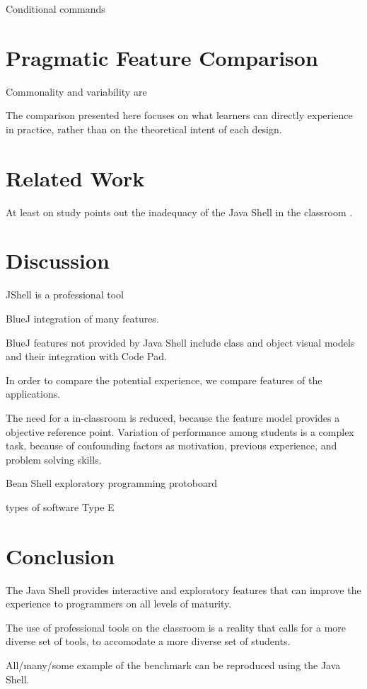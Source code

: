 \documentclass{article}
\begin{document}
Conditional commands


\section{Pragmatic Feature Comparison}
Commonality and variability are

The comparison presented here focuses on what learners can directly experience in practice, rather than on the theoretical intent of each design.

\section{Related Work}

At least on study points out the inadequacy of the Java Shell in the classroom
\cite{politz_minnes2018jshell}.

\section{Discussion}

JShell is a professional tool

BlueJ integration of many features.

BlueJ features not provided by Java Shell include class and object visual models and their integration with Code Pad.

In order to compare the potential experience, we compare features of the applications.

The need for a in-classroom is reduced, because the feature model provides a objective reference point. Variation of performance among students is a complex task, because of confounding factors as motivation, previous experience, and problem solving skills.

Bean Shell exploratory programming
protoboard

types of software 
Type E


\section{Conclusion}

The Java Shell provides interactive and exploratory features that can improve the experience to programmers on all levels of maturity.

The use of professional tools on the classroom is a reality that calls for a more diverse set of tools, to accomodate a more diverse set of students.

All/many/some example of the benchmark can be reproduced using the Java Shell.
\end{document}
